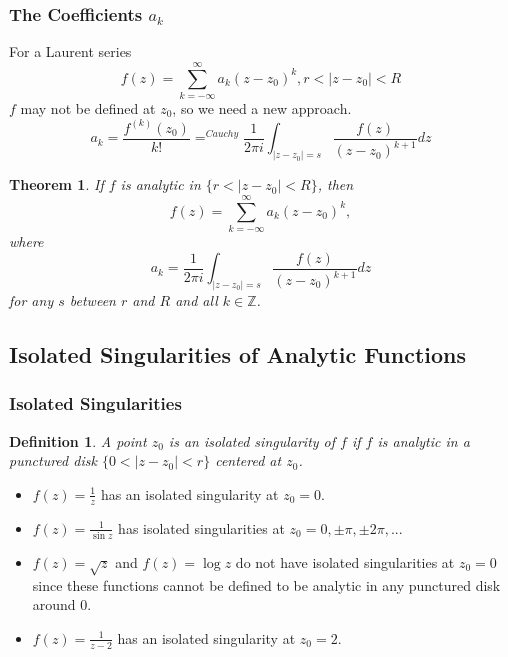 \documentclass{article}
\newtheorem{theorem}{Theorem}[section]
\newtheorem{definition}{Definition}[section]
\begin{document}
\subsubsection{The Coefficients $a_k$}
For a Laurent series 
\begin{equation*}
f(z) = \sum_{k=-\infty}^{\infty}a_k(z - z_0)^k, r < \left|z - z_0\right| < R
\end{equation*}
$f$ may not be defined at $z_0$, so we need a new approach.
\begin{equation*}
a_k = \frac{f^{(k)}(z_0)}{k!} =^{Cauchy} \frac{1}{2\pi i} \int_{\left|z - z_0\right| = s} \frac{f(z)}{(z - z_0)^{k+1}} dz
\end{equation*}
\begin{theorem}
If $f$ is analytic in $\{ r < \left|z - z_0\right| < R \}$, then
\begin{equation*}
f(z) = \sum_{k=-\infty}^{\infty} a_k(z - z_0)^k,
\end{equation*}
where
\begin{equation*}
a_k = \frac{1}{2\pi i} \int_{\left|z - z_0\right| = s} \frac{f(z)}{(z - z_0)^{k+1}}dz
\end{equation*}
for any $s$ between $r$ and $R$ and all $k \in \mathbb{Z}$.
\end{theorem}

\subsection{Isolated Singularities of Analytic Functions}

\subsubsection{Isolated Singularities}
\begin{definition}
A point $z_0$ is an isolated singularity of $f$ if $f$ is analytic in a punctured disk $\{0 < \left|z - z_0\right| < r \}$ centered at $z_0$.
\end{definition}
\begin{itemize}
\item $f(z) = \frac{1}{z}$ has an isolated singularity at $z_0 = 0$.
\item $f(z) = \frac{1}{\sin z}$ has isolated singularities at $z_0 = 0, \pm \pi, \pm 2\pi,...$
\item $f(z) = \sqrt{z}$ and $f(z) = \log z$ do not have isolated singularities at $z_0 = 0$ since these functions cannot be defined to be analytic in any punctured disk around $0$.
\item $f(z) = \frac{1}{z - 2}$ has an isolated singularity at $z_0 = 2$.
\end{itemize}
\end{document}

